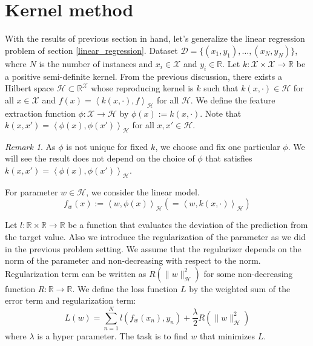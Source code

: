 \documentclass{amsart}
\theoremstyle{definition}
\theoremstyle{remark}
\newtheorem{remark}[theorem]{Remark}
\numberwithin{equation}{section}
\begin{document}
\section{Kernel method}

With the results of previous section in hand, let's generalize the linear regression problem of section \ref{linear_regression}.
Dataset $\mathcal{D} = \{ (x_1, y_1), \ldots, (x_N, y_N) \}$,
where $N$ is the number of instances and $x_i \in \mathcal{X}$ and $y_i \in \mathbb{R}$.
Let $k: \mathcal{X}\times \mathcal{X}\to \mathbb{R}$ be a positive semi-definite kernel.
From the previous discussion, there exists a Hilbert space $\mathcal{H} \subset \mathbb{R}^{\mathcal{X}}$
whose reproducing kernel is $k$ such that $k(x, \cdot)\in \mathcal{H}$ for all $x\in \mathcal{X}$ and $f(x) = \left<k(x, \cdot), f \right>_\mathcal{H}$ for all $\mathcal{H}$.
We define the feature extraction function $\phi: \mathcal{X}\to \mathcal{H}$ by $\phi(x):= k(x, \cdot)$.
Note that $k(x, x') = \left< \phi(x), \phi(x') \right>_\mathcal{H}$ for all $x, x'\in \mathcal{H}$.

\begin{remark}
As $\phi$ is not unique for fixed $k$, we choose and fix one particular $\phi$.
We will see the result does not depend on the choice of $\phi$ that satisfies $k(x, x') = \left< \phi(x), \phi(x')\right>_\mathcal{H}$.
\end{remark}

For parameter $w\in \mathcal{H}$, we consider the linear model.
\begin{equation}
f_w(x) := \left<w, \phi(x)\right>_\mathcal{H} \left(= \left<w, k(x, \cdot)\right>_\mathcal{H}\right)
\end{equation}

Let $l: \mathbb{R}\times \mathbb{R}\to \mathbb{R}$ be a function that evaluates the deviation of the prediction 
from the target value. Also we introduce the regularization of the parameter as we did in the previous problem setting.
We assume that the regularizer depends on the norm of the parameter and non-decreasing with respect to the norm.
Regularization term can be written as $R(\|w\|^2_\mathcal{H})$ for some non-decreasing function $R: \mathbb{R} \to \mathbb{R}$.
We define the loss function $L$ by the weighted sum of the error term and regularization term:
\begin{equation}
L(w) = \sum_{n=1}^{N} l(f_w(x_n), y_n) + \frac{\lambda}{2} R(\|w\|_\mathcal{H}^2)
\end{equation}
where $\lambda$ is a hyper parameter. The task is to find $w$ that minimizes $L$.
\end{document}
